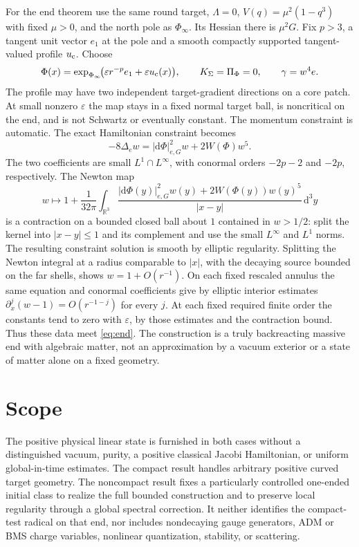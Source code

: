 \documentclass[11pt]{article}
\newcommand{\dd}{\mathrm d}
\begin{document}
For the end theorem use the same round target, \(\Lambda=0\), \(V(q)=\mu^2(1-q^3)\) with fixed \(\mu>0\), and the north pole as \(\Phi_\infty\). Its Hessian there is \(\mu^2G\). Fix \(p>3\), a tangent unit vector \(e_1\) at the pole and a smooth compactly supported tangent-valued profile \(u_{\rm c}\). Choose
\[
 \Phi(x)=\exp_{\Phi_\infty}\!\bigl(\varepsilon r^{-p}e_1+\varepsilon u_{\rm c}(x)\bigr),
 \qquad K_\Sigma=\Pi_\Phi=0,\qquad \gamma=w^4 e .
\]
The profile may have two independent target-gradient directions on a core patch. At small nonzero \(\varepsilon\) the map stays in a fixed normal target ball, is noncritical on the end, and is not Schwartz or eventually constant. The momentum constraint is automatic. The exact Hamiltonian constraint becomes
\[
 -8\Delta_e w=|\dd\Phi|_{e,G}^2 w+2W(\Phi)w^5 .
\]
The two coefficients are small \(L^1\cap L^\infty\), with conormal orders \(-2p-2\) and \(-2p\), respectively. The Newton map
\[
 w\longmapsto 1+\frac1{32\pi}\int_{\mathbb R^3}
     \frac{|\dd\Phi(y)|_{e,G}^2 w(y)+2W(\Phi(y))w(y)^5}{|x-y|}\,\dd^3y
\]
is a contraction on a bounded closed ball about \(1\) contained in \(w>1/2\): split the kernel into \(|x-y|\leq1\) and its complement and use the small \(L^\infty\) and \(L^1\) norms. The resulting constraint solution is smooth by elliptic regularity. Splitting the Newton integral at a radius comparable to \(|x|\), with the decaying source bounded on the far shells, shows \(w=1+O(r^{-1})\). On each fixed rescaled annulus the same equation and conormal coefficients give by elliptic interior estimates
\(\partial_x^j(w-1)=O(r^{-1-j})\) for every \(j\). At each fixed required finite order the constants tend to zero with \(\varepsilon\), by those estimates and the contraction bound. Thus these data meet \eqref{eq:end}. The construction is a truly backreacting massive end with algebraic matter, not an approximation by a vacuum exterior or a state of matter alone on a fixed geometry.

\section{Scope}

The positive physical linear state is furnished in both cases without a distinguished vacuum, purity, a positive classical Jacobi Hamiltonian, or uniform global-in-time estimates. The compact result handles arbitrary positive curved target geometry. The noncompact result fixes a particularly controlled one-ended initial class to realize the full bounded construction and to preserve local regularity through a global spectral correction. It neither identifies the compact-test radical on that end, nor includes nondecaying gauge generators, ADM or BMS charge variables, nonlinear quantization, stability, or scattering.
\end{document}
